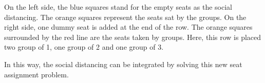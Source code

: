 On the left side, the blue squares stand for the empty seats as the social distancing. The orange squares represent the seats sat by the groups. 
On the right side, one dummy seat is added at the end of the row. The orange squares surrounded by the red line are the seats taken by groups. Here, this row is placed two group of 1, one group of 2 and one group of 3.

In this way, the social distancing can be integrated by solving this new seat assignment problem.











